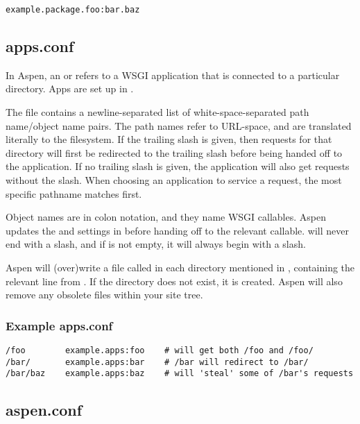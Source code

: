 \begin{verbatim}
example.package.foo:bar.baz
\end{verbatim}




\subsection{apps.conf}
\label{apps-conf}

In Aspen, an  or  refers to a WSGI application that is
connected to a particular directory. Apps are set up in .

The  file contains a newline-separated list of
white-space-separated path name/object name pairs. The path names refer to
URL-space, and are translated literally to the filesystem. If the trailing slash
is given, then requests for that directory will first be redirected to the
trailing slash before being handed off to the application. If no trailing slash
is given, the application will also get requests without the slash. When
choosing an application to service a request, the most specific pathname matches
first.

Object names are in colon notation, and they name WSGI callables. Aspen updates
the  and  settings in  before
handing off to the relevant callable.  will never end with a
slash, and if  is not empty, it will always begin with a slash.

Aspen will (over)write a file called  in each directory
mentioned in , containing the relevant line from
. If the directory does not exist, it is created. Aspen will
also remove any obsolete  files within your site tree.


\subsubsection{Example apps.conf}

\begin{verbatim}
/foo        example.apps:foo    # will get both /foo and /foo/
/bar/       example.apps:bar    # /bar will redirect to /bar/
/bar/baz    example.apps:baz    # will 'steal' some of /bar's requests
\end{verbatim}


\subsection{aspen.conf}
\label{aspen-conf}


